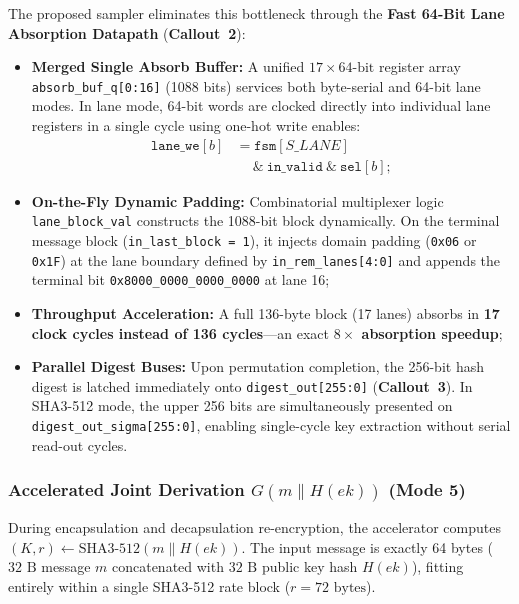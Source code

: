 The proposed sampler eliminates this bottleneck through the \textbf{Fast 64-Bit Lane Absorption Datapath} (\textbf{Callout~2}):
\begin{itemize}
    \item \textbf{Merged Single Absorb Buffer:} A unified $17 \times 64\text{-bit}$ register array \texttt{absorb\_buf\_q[0:16]} (1088 bits) services both byte-serial and 64-bit lane modes. In lane mode, 64-bit words are clocked directly into individual lane registers in a single cycle using one-hot write enables:
    \begin{equation}
    \begin{aligned}
    \texttt{lane\_we}[b] &= \texttt{fsm}[S\_LANE] \\
    &\quad \ \& \ \texttt{in\_valid} \ \& \ \texttt{sel}[b];
    \end{aligned}
    \label{eq:lane_we}
    \end{equation}
    \item \textbf{On-the-Fly Dynamic Padding:} Combinatorial multiplexer logic \texttt{lane\_block\_val} constructs the 1088-bit block dynamically. On the terminal message block (\texttt{in\_last\_block = 1}), it injects domain padding (\texttt{0x06} or \texttt{0x1F}) at the lane boundary defined by \texttt{in\_rem\_lanes[4:0]} and appends the terminal bit \texttt{0x8000\_0000\_0000\_0000} at lane 16;
    \item \textbf{Throughput Acceleration:} A full 136-byte block (17 lanes) absorbs in \textbf{17 clock cycles instead of 136 cycles}---an exact \textbf{$8\times$ absorption speedup};
    \item \textbf{Parallel Digest Buses:} Upon permutation completion, the 256-bit hash digest is latched immediately onto \texttt{digest\_out[255:0]} (\textbf{Callout~3}). In SHA3-512 mode, the upper 256 bits are simultaneously presented on \texttt{digest\_out\_sigma[255:0]}, enabling single-cycle key extraction without serial read-out cycles.
\end{itemize}

\subsubsection{Accelerated Joint Derivation \texorpdfstring{$G(m \parallel H(ek))$}{G(m || H(ek))} (Mode 5)}
During encapsulation and decapsulation re-encryption, the accelerator computes $(K, r) \leftarrow \text{SHA3-512}(m \parallel H(ek))$. The input message is exactly 64 bytes ($32\text{ B}$ message $m$ concatenated with $32\text{ B}$ public key hash $H(ek)$), fitting entirely within a single SHA3-512 rate block ($r = 72\text{ bytes}$).

